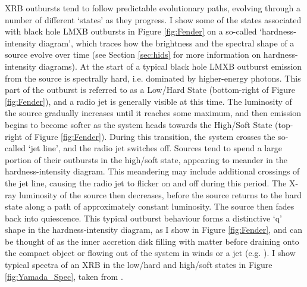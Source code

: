 \par XRB outbursts tend to follow predictable evolutionary paths, evolving through a number of different `states' as they progress.  I show some of the states associated with black hole LMXB outbursts in Figure \ref{fig:Fender} on a so-called `hardness-intensity diagram', which traces how the brightness and the spectral shape of a source evolve over time (see Section \ref{sec:hids} for more information on hardness-intensity diagrams).  At the start of a typical black hole LMXB outburst emission from the source is spectrally hard, i.e. dominated by higher-energy photons.  This part of the outburst is referred to as a Low/Hard State (bottom-right of Figure \ref{fig:Fender}), and a radio jet is generally visible at this time.  The luminosity of the source gradually increases until it reaches some maximum, and then emission begins to become softer as the system heads towards the High/Soft State (top-right of Figure \ref{fig:Fender}).  During this transition, the system crosses the so-called `jet line', and the radio jet switches off.  Sources tend to spend a large portion of their outbursts in the high/soft state, appearing to meander in the hardness-intensity diagram.  This meandering may include additional crossings of the jet line, causing the radio jet to flicker on and off during this period.  The X-ray luminosity of the source then decreases, before the source returns to the hard state along a path of approximately constant luminosity.  The source then fades back into quiescence.  This typical outburst behaviour forms a distinctive `q' shape in the hardness-intensity diagram, as I show in Figure \ref{fig:Fender}, and can be thought of as the inner accretion disk filling with matter before draining onto the compact object or flowing out of the system in winds or a jet (e.g. \citealp{Fender_UniJets}).  I show typical spectra of an XRB in the low/hard and high/soft states in Figure \ref{fig:Yamada_Spec}, taken from \citet{Yamada_Spec}.

